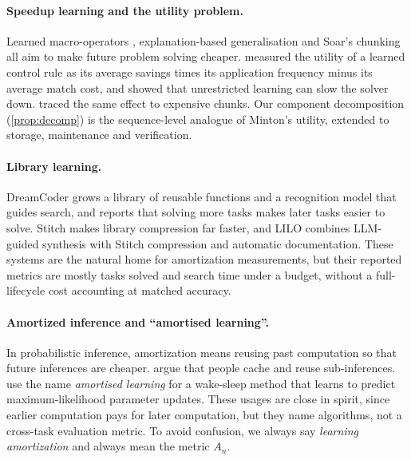 \documentclass[11pt]{article}
\theoremstyle{remark}
\begin{document}
\paragraph{Speedup learning and the utility problem.}
Learned macro-operators \citep{fikes1972learning}, explanation-based generalisation \citep{mitchell1986ebg} and Soar's chunking \citep{laird1986chunking} all aim to make future problem solving cheaper.
\citet{minton1990quantitative} measured the utility of a learned control rule as its average savings times its application frequency minus its average match cost, and showed that unrestricted learning can slow the solver down.
\citet{tambe1990expensive} traced the same effect to expensive chunks.
Our component decomposition (\cref{prop:decomp}) is the sequence-level analogue of Minton's utility, extended to storage, maintenance and verification.

\paragraph{Library learning.}
DreamCoder \citep{ellis2021dreamcoder} grows a library of reusable functions and a recognition model that guides search, and reports that solving more tasks makes later tasks easier to solve.
Stitch \citep{bowers2023stitch} makes library compression far faster, and LILO \citep{grand2024lilo} combines LLM-guided synthesis with Stitch compression and automatic documentation.
These systems are the natural home for amortization measurements, but their reported metrics are mostly tasks solved and search time under a budget, without a full-lifecycle cost accounting at matched accuracy.

\paragraph{Amortized inference and ``amortised learning''.}
In probabilistic inference, amortization means reusing past computation so that future inferences are cheaper.
\citet{gershman2014amortized} argue that people cache and reuse sub-inferences.
\citet{wenliang2020amortised} use the name \emph{amortised learning} for a wake-sleep method that learns to predict maximum-likelihood parameter updates.
These usages are close in spirit, since earlier computation pays for later computation, but they name algorithms, not a cross-task evaluation metric.
To avoid confusion, we always say \emph{learning amortization} and always mean the metric $A_n$.
\end{document}
